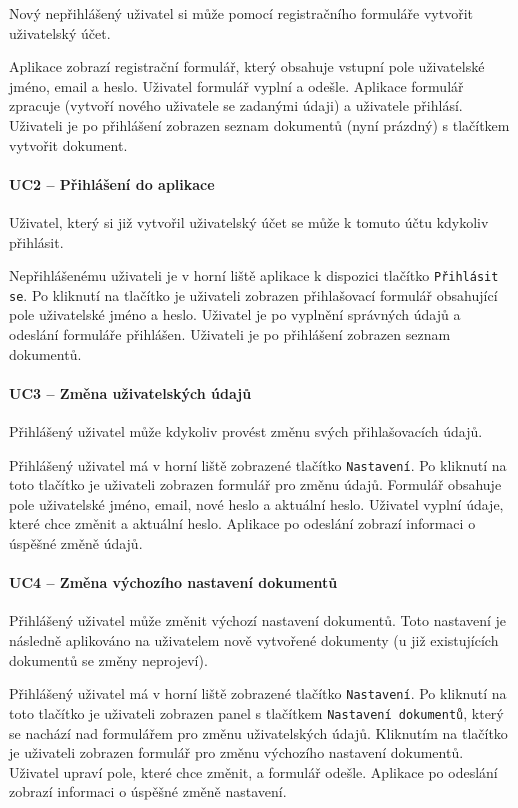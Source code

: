 Nový nepřihlášený uživatel si může pomocí registračního formuláře vytvořit uživatelský účet.

Aplikace zobrazí registrační formulář, který obsahuje vstupní pole uživatelské jméno, email a heslo.
Uživatel formulář vyplní a odešle.
Aplikace formulář zpracuje (vytvoří nového uživatele se zadanými údaji) a uživatele přihlásí.
Uživateli je po přihlášení zobrazen seznam dokumentů (nyní prázdný) s tlačítkem vytvořit dokument.

\paragraph{UC2 -- Přihlášení do aplikace}

Uživatel, který si již vytvořil uživatelský účet se může k tomuto účtu kdykoliv přihlásit.

Nepřihlášenému uživateli je v horní liště aplikace k dispozici tlačítko \texttt{Při\-hlásit se}.
Po kliknutí na tlačítko je uživateli zobrazen přihlašovací formulář obsahující pole uživatelské jméno a heslo.
Uživatel je po vyplnění správných údajů a odeslání formuláře přihlášen.
Uživateli je po přihlášení zobrazen seznam dokumentů.

\paragraph{UC3 -- Změna uživatelských údajů}

Přihlášený uživatel může kdykoliv provést změnu svých přihlašovacích údajů.

Přihlášený uživatel má v horní liště zobrazené tlačítko \texttt{Nastavení}.
Po kliknutí na toto tlačítko je uživateli zobrazen formulář pro změnu údajů.
Formulář obsahuje pole uživatelské jméno, email, nové heslo a aktuální heslo.
Uživatel vyplní údaje, které chce změnit a aktuální heslo.
Aplikace po odeslání zobrazí informaci o úspěšné změně údajů.

\paragraph{UC4 -- Změna výchozího nastavení dokumentů}

Přihlášený uživatel může změnit výchozí nastavení dokumentů.
Toto nastavení je následně aplikováno na uživatelem nově vytvořené dokumenty (u již existujících dokumentů se změny neprojeví).

Přihlášený uživatel má v horní liště zobrazené tlačítko \texttt{Nastavení}.
Po kliknutí na toto tlačítko je uživateli zobrazen panel s tlačítkem \texttt{Nastavení dokumentů}, který se nachází nad formulářem pro změnu uživatelských údajů.
Kliknutím na tlačítko je uživateli zobrazen formulář pro změnu výchozího nastavení dokumentů.
Uživatel upraví pole, které chce změnit, a formulář odešle.
Aplikace po odeslání zobrazí informaci o úspěšné změně nastavení.

